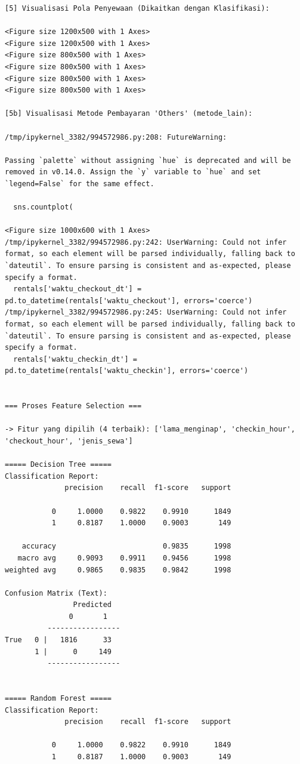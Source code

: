 \begin{lstlisting}[caption={Output 11}]
[5] Visualisasi Pola Penyewaan (Dikaitkan dengan Klasifikasi):

<Figure size 1200x500 with 1 Axes>
<Figure size 1200x500 with 1 Axes>
<Figure size 800x500 with 1 Axes>
<Figure size 800x500 with 1 Axes>
<Figure size 800x500 with 1 Axes>
<Figure size 800x500 with 1 Axes>

[5b] Visualisasi Metode Pembayaran 'Others' (metode_lain):

/tmp/ipykernel_3382/994572986.py:208: FutureWarning: 

Passing `palette` without assigning `hue` is deprecated and will be removed in v0.14.0. Assign the `y` variable to `hue` and set `legend=False` for the same effect.

  sns.countplot(

<Figure size 1000x600 with 1 Axes>
/tmp/ipykernel_3382/994572986.py:242: UserWarning: Could not infer format, so each element will be parsed individually, falling back to `dateutil`. To ensure parsing is consistent and as-expected, please specify a format.
  rentals['waktu_checkout_dt'] = pd.to_datetime(rentals['waktu_checkout'], errors='coerce')
/tmp/ipykernel_3382/994572986.py:245: UserWarning: Could not infer format, so each element will be parsed individually, falling back to `dateutil`. To ensure parsing is consistent and as-expected, please specify a format.
  rentals['waktu_checkin_dt'] = pd.to_datetime(rentals['waktu_checkin'], errors='coerce')


=== Proses Feature Selection ===

-> Fitur yang dipilih (4 terbaik): ['lama_menginap', 'checkin_hour', 'checkout_hour', 'jenis_sewa']

===== Decision Tree =====
Classification Report:
              precision    recall  f1-score   support

           0     1.0000    0.9822    0.9910      1849
           1     0.8187    1.0000    0.9003       149

    accuracy                         0.9835      1998
   macro avg     0.9093    0.9911    0.9456      1998
weighted avg     0.9865    0.9835    0.9842      1998

Confusion Matrix (Text):
                Predicted
               0       1
          -----------------
True   0 |   1816      33
       1 |      0     149
          -----------------


===== Random Forest =====
Classification Report:
              precision    recall  f1-score   support

           0     1.0000    0.9822    0.9910      1849
           1     0.8187    1.0000    0.9003       149


\end{lstlisting}
